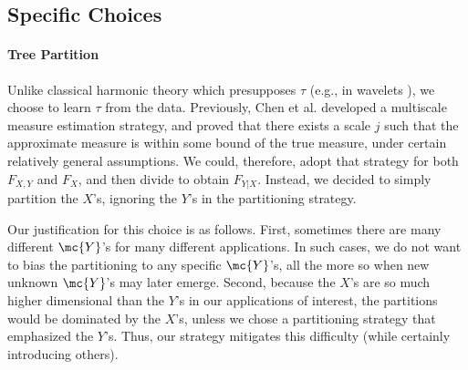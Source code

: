 
\subsection{Specific Choices} \label{sub:spec}

	\paragraph{Tree Partition} Unlike classical harmonic theory which presupposes $\tau$ (e.g., in wavelets \cite{Daubechies1992}), we choose to learn $\tau$ from the data. Previously, Chen et al. \cite{ChenMaggioni12} developed a multiscale measure estimation strategy, and proved that there exists a scale $j$ such that the approximate measure is within some bound of the true measure, under certain relatively general assumptions.  We could, therefore, adopt that strategy for both $F_{X,Y}$ and $F_{X}$, and then divide to obtain $F_{Y|X}$.  Instead, we decided to simply partition the $X$'s, ignoring the $Y$'s in the partitioning strategy.  
	
	Our justification for this choice is as follows. First, sometimes there are many different $\mc{Y}$'s for many different applications.  In such cases, we do not want to bias the partitioning to any specific $\mc{Y}$'s, all the more so when new unknown $\mc{Y}$'s may later emerge.  Second, because the $X$'s are so much higher dimensional than the $Y$'s in our applications of interest, the partitions would be dominated by the $X$'s, unless we chose a partitioning strategy that emphasized the $Y$'s.  Thus, our strategy mitigates this difficulty (while certainly introducing others). 

